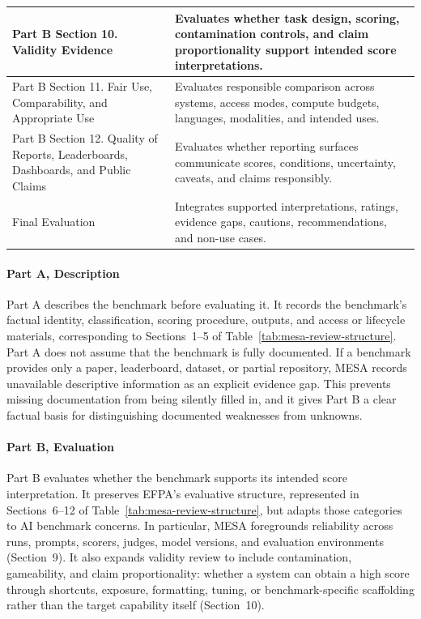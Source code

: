 \documentclass[conference]{IEEEtran}
\begin{document}
\begin{table}[t]
\begin{tabularx}{\textwidth}{@{}>{\raggedright\arraybackslash}p{}>{\raggedright\arraybackslash}X@{}}
    Part B Section 10. Validity Evidence & Evaluates whether task design, scoring, contamination controls, and claim proportionality support intended score interpretations. \\ \hline
    Part B Section 11. Fair Use, Comparability, and Appropriate Use & Evaluates responsible comparison across systems, access modes, compute budgets, languages, modalities, and intended uses. \\ \hline
    Part B Section 12. Quality of Reports, Leaderboards, Dashboards, and Public Claims & Evaluates whether reporting surfaces communicate scores, conditions, uncertainty, caveats, and claims responsibly. \\ \hline
    Final Evaluation & Integrates supported interpretations, ratings, evidence gaps, cautions, recommendations, and non-use cases. \\
    \bottomrule
    \end{tabularx}
    \end{table}
    
    \paragraph{Part A, Description}
    Part A describes the benchmark before evaluating it. It records the benchmark's factual identity, classification, scoring procedure, outputs, and access or lifecycle materials, corresponding to Sections~1--5 of Table~\ref{tab:mesa-review-structure}. Part A does not assume that the benchmark is fully documented. If a benchmark provides only a paper, leaderboard, dataset, or partial repository, MESA records unavailable descriptive information as an explicit evidence gap. This prevents missing documentation from being silently filled in, and it gives Part B a clear factual basis for distinguishing documented weaknesses from unknowns.
    
    \paragraph{Part B, Evaluation}
    Part B evaluates whether the benchmark supports its intended score interpretation. It preserves EFPA's evaluative structure, represented in Sections~6--12 of Table~\ref{tab:mesa-review-structure}, but adapts those categories to AI benchmark concerns. In particular, MESA foregrounds reliability across runs, prompts, scorers, judges, model versions, and evaluation environments (Section~9). It also expands validity review to include contamination, gameability, and claim proportionality: whether a system can obtain a high score through shortcuts, exposure, formatting, tuning, or benchmark-specific scaffolding rather than the target capability itself (Section~10).
    
\end{document}
